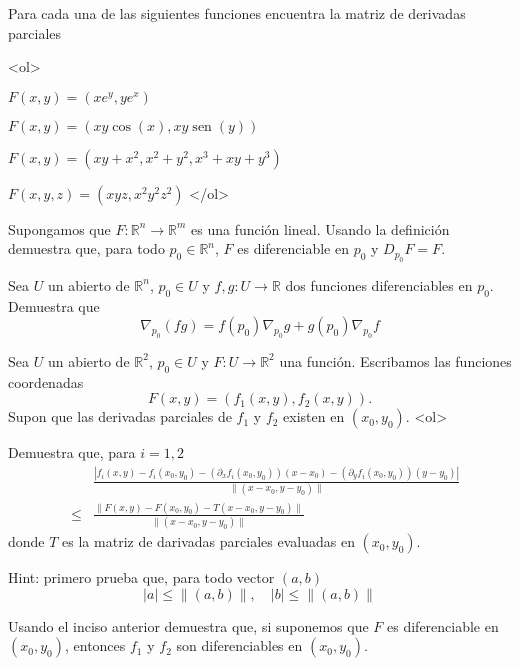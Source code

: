 \documentclass{article}
\theoremstyle{definition}
\newcommand{\sen}{\operatorname{sen}}
\begin{document}
      \item Para cada una de las siguientes funciones encuentra la matriz de derivadas
        parciales

        <ol>
        \item $F(x,y)=(xe^y, ye^x)$
        \item $F(x,y)=(xy\cos(x), xy\sen(y))$
        \item $F(x,y)=(xy+x^2,x^2+y^2, x^3+xy+y^3)$
        \item $F(x,y,z)=(xyz, x^2y^2z^2)$
        </ol>


        
      \item Supongamos que  $F:\mathbb{R}^n \to \mathbb{R}^m$ es una función lineal.
        Usando la definición demuestra que, para todo $p_0\in \mathbb{R}^n$, $F$ es
        diferenciable en $p_0$ y $D_{p_0}F=F$.


      \item Sea $U$ un abierto de $\mathbb{R}^n$, $p_0\in U$  y $f,g:U \to \mathbb{R}$ dos funciones diferenciables en 
         $p_0$. Demuestra que
        $$
        \nabla_{p_0}(fg)=f(p_0)\nabla_{p_0}g + g(p_0)\nabla_{p_0}f  
        $$




          \item Sea $U$ un abierto de $\mathbb{R}^2$, $p_0\in U$
            y $F:U \to \mathbb{R}^2$ una función. Escribamos
            las funciones coordenadas
            $$
            F(x,y)=(f_1(x,y), f_2(x,y)).
            $$
            Supon que las derivadas parciales de  $f_1$ y
            $f_2$ existen en $(x_0,y_0)$.
            <ol>
            \item Demuestra que, para $i=1,2$
              \begin{eqnarray*}
                & & \frac{|f_i(x,y)-f_i(x_0,y_0)-(\partial_xf_i(x_0,y_0))(x-x_0)-
                (\partial_yf_i(x_0,y_0))(y-y_0)|}{\|(x-x_0,y-y_0)\|} \\
              &\leq &
              \frac{\|F(x,y)-F(x_0,y_0)-T(x-x_0,y-y_0) \|}{\|(x-x_0,y-y_0)\|}
              \end{eqnarray*}
            donde $T$ es la matriz de darivadas parciales evaluadas
            en $(x_0,y_0)$.

            Hint: primero prueba  que, para todo vector $(a,b)$
            $$
            |a|\leq \| (a,b)\|, \quad |b|\leq \|(a,b) \|
            $$
            
          \item Usando el inciso anterior demuestra que, si suponemos
            que $F$ es diferenciable en $(x_0,y_0)$, entonces
            $f_1$ y $f_2$ son diferenciables en $(x_0,y_0)$.
\end{document}
